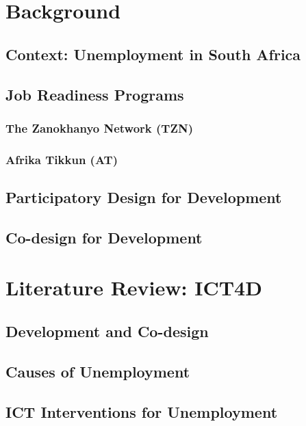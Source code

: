 \documentclass[12pt,a4paper,oneside]{report}
\begin{document}
\chapter{Background}

\section{Context: Unemployment in South Africa}

\section{Job Readiness Programs}
\subsection{The Zanokhanyo Network (TZN)}
\subsection{Afrika Tikkun (AT)}

\section{Participatory Design for Development}

\section{Co-design for Development}


\chapter{Literature Review: ICT4D}

\section{Development and Co-design}

\section{Causes of Unemployment}

\section{ICT Interventions for Unemployment}
\end{document}

